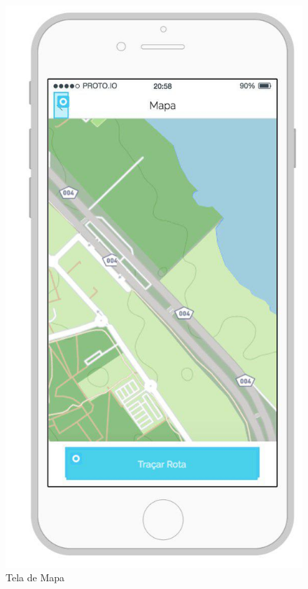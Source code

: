 \begin{figure}[!htb]
	\centering
	\includegraphics[scale=0.50]{tela_mapa.jpg}
	\caption{Tela de Mapa}
	\label{img:telamapa}
\end{figure}

